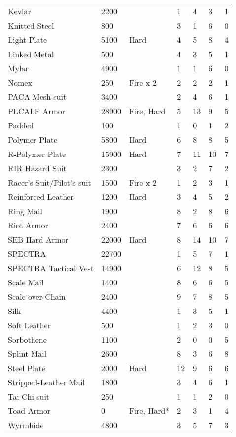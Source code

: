 \documentclass[twoside]{book}
\begin{document}
\begin{longtable}{p{1.25in}llp{2em}p{2em}p{2em}p{2em}}
      \raggedright Kevlar & 2200 && 1 & 4 & 3 & 1 \tabularnewline
      \raggedright Knitted Steel & 800 && 3 & 1 & 6 & 0 \tabularnewline
      \raggedright Light Plate & 5100 & Hard & 4 & 5 & 8 & 4 \tabularnewline
      \raggedright Linked Metal & 500 && 4 & 3 & 5 & 1 \tabularnewline
      \raggedright Mylar & 4900 && 1 & 1 & 6 & 0 \tabularnewline
      \raggedright Nomex & 250 & Fire x 2 & 2 & 2 & 2 & 1 \tabularnewline
      \raggedright PACA Mesh suit & 3400 && 2 & 4 & 6 & 1 \tabularnewline
      \raggedright PLCALF Armor & 28900 & Fire, Hard & 5 & 13 & 9 & 5 \tabularnewline
      \raggedright Padded & 100 && 1 & 0 & 1 & 2 \tabularnewline
      \raggedright Polymer Plate & 5800 & Hard & 6 & 8 & 8 & 5 \tabularnewline
      \raggedright R-Polymer Plate & 15900 & Hard & 7 & 11 & 10 & 7 \tabularnewline
      \raggedright RIR Hazard Suit & 2300 && 3 & 2 & 7 & 2 \tabularnewline
      \raggedright Racer's Suit/Pilot's
           suit & 1500 & Fire x 2 & 1 & 2 & 3 & 1 \tabularnewline
      \raggedright Reinforced Leather & 1200 & Hard & 3 & 4 & 5 & 2 \tabularnewline
      \raggedright Ring Mail & 1900 && 8 & 2 & 8 & 6 \tabularnewline
      \raggedright Riot Armor & 2400 && 7 & 6 & 6 & 6 \tabularnewline
      \raggedright SEB Hard Armor & 22000 & Hard & 8 & 14 & 10 & 7 \tabularnewline
      \raggedright SPECTRA & 22700 && 1 & 5 & 7 & 1 \tabularnewline
      \raggedright SPECTRA Tactical Vest & 14900 && 6 & 12 & 8 & 5 \tabularnewline
      \raggedright Scale Mail & 1400 && 8 & 6 & 6 & 5 \tabularnewline
      \raggedright Scale-over-Chain & 2400 && 9 & 7 & 8 & 5 \tabularnewline
      \raggedright Silk & 4400 && 1 & 3 & 5 & 1 \tabularnewline
      \raggedright Soft Leather & 500 && 1 & 2 & 3 & 0 \tabularnewline
      \raggedright Sorbothene & 1100 && 2 & 0 & 0 & 5 \tabularnewline
      \raggedright Splint Mail & 2600 && 8 & 3 & 6 & 8 \tabularnewline
      \raggedright Steel Plate & 2000 & Hard & 12 & 9 & 6 & 6 \tabularnewline
      \raggedright Stripped-Leather Mail & 1800 && 3 & 4 & 6 & 1 \tabularnewline
      \raggedright Tai Chi suit & 250 && 1 & 1 & 2 & 0 \tabularnewline
      \raggedright Toad Armor & 0 & Fire, Hard* & 2 & 3 & 1 & 4 \tabularnewline
      \raggedright Wyrmhide & 4800 && 3 & 5 & 7 & 3 \tabularnewline
      
\end{longtable}
    
\end{document}
